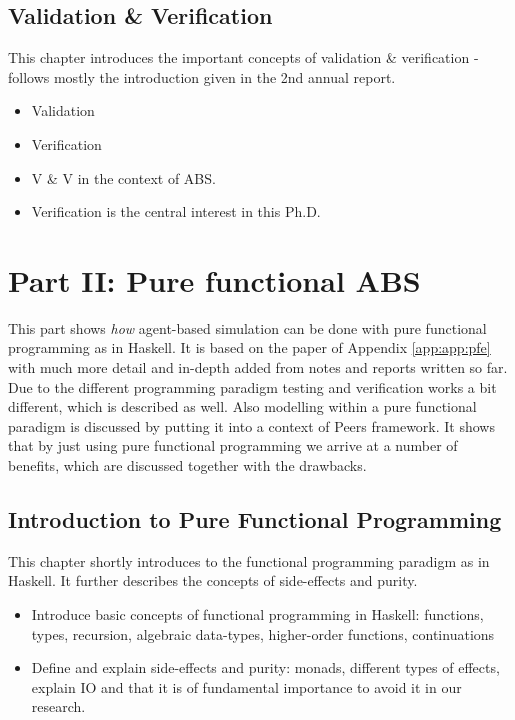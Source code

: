 \subsection{Validation \& Verification}
This chapter introduces the important concepts of validation \& verification - follows mostly the introduction given in the 2nd annual report.
\begin{itemize}
	\item Validation
	\item Verification
	\item V \& V in the context of ABS.
	\item Verification is the central interest in this Ph.D.
\end{itemize}

\section{Part II: Pure functional ABS}
This part shows \textit{how} agent-based simulation can be done with pure functional programming as in Haskell. It is based on the paper of Appendix \ref{app:app:pfe} with much more detail and in-depth added from notes and reports written so far. Due to the different programming paradigm testing and verification works a bit different, which is described as well. Also modelling within a pure functional paradigm is discussed by putting it into a context of Peers framework. It shows that by just using pure functional programming we arrive at a number of benefits, which are discussed together with the drawbacks.

\subsection{Introduction to Pure Functional Programming}
This chapter shortly introduces to the functional programming paradigm as in Haskell. It further describes the concepts of side-effects and purity.
\begin{itemize}
	\item Introduce basic concepts of functional programming in Haskell: functions, types, recursion, algebraic data-types, higher-order functions, continuations
	\item Define and explain side-effects and purity: monads, different types of effects, explain IO and that it is of fundamental importance to avoid it in our research.
\end{itemize}


